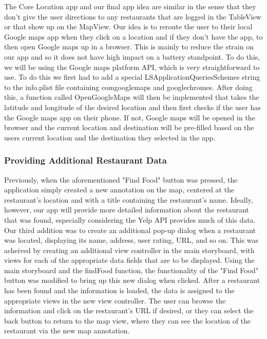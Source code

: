 \documentclass[conference]{IEEEtran}
\begin{document}
The Core Location app and our final app idea are similar in the 
sense that they don't give the user directions to any restaurants that 
are logged in the TableView or that show up on the MapView. Our idea is to 
reroute the user to their local Google maps app when they click on a location 
and if they don't have the app, to then open Google maps up in a browser. This 
is mainly to reduce the strain on our app and so it does not have high impact 
on a battery standpoint. To do this, we will be using the Google maps platform 
API, which is very straightforward to use. To do this we first had to add a 
special LSApplicationQueriesSchemes string to the info.plist file containing 
comgooglemaps and googlechromes. After doing this, a function called OpenGoogleMaps 
will then be implemented that takes the latitude and longitude of the desired 
location and then first checks if the user has the Google maps app on their phone. 
If not, Google maps will be opened in the browser and the current location and 
destination will be pre-filled based on the users current location and the 
destination they selected in the app.

\subsubsection{Providing Additional Restaurant Data}
Previously, when the aforementioned "Find Food" button was pressed, the application
simply created a new annotation on the map, centered at the restaurant's location
and with a title containing the restaurant's name. Ideally, however, our app will
provide more detailed information about the restaurant that was found, especially
considering the Yelp API provides much of this data. Our third addition was to
create an additional pop-up dialog when a restaurant was located, displaying its
name, address, user rating, URL, and so on. This was acheived by creating an
additional view controller in the main storyboard, with views for each of the
appropriate data fields that are to be displayed. Using the main storyboard and
the findFood function, the functionality of the "Find Food" button was modified
to bring up this new dialog when clicked. After a restaurant has been found and the
information is loaded, the data is assigned to the appropriate views in the new view
controller. The user can browse the information and click on the restaurant's URL if
desired, or they can select the back button to return to the map view, where they
can see the location of the restaurant via the new map annotation.
\end{document}
